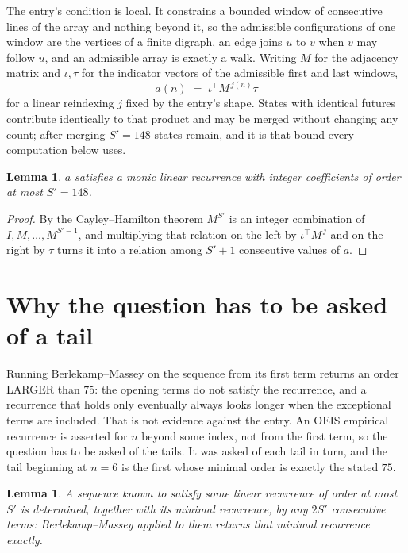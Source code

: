 \documentclass[11pt,a4paper]{article}
\theoremstyle{plain}
\newtheorem{lemma}[theorem]{Lemma}
\theoremstyle{definition}
\begin{document}
The entry's condition is local. It constrains a bounded window of consecutive lines of the
array and nothing beyond it, so the admissible configurations of one window are the vertices of
a finite digraph, an edge joins $u$ to $v$ when $v$ may follow $u$, and an admissible array is
exactly a walk. Writing $M$ for the adjacency matrix and $\iota,\tau$ for the indicator vectors
of the admissible first and last windows,
\[
a(n)\;=\;\iota^{\!\top}M^{\,j(n)}\tau
\]
for a linear reindexing $j$ fixed by the entry's shape. States with identical futures
contribute identically to that product and may be merged without changing any count; after
merging $S'=148$ states remain, and it is that bound every computation below uses.

\begin{lemma}\label{lem:cf}
$a$ satisfies a monic linear recurrence with integer coefficients of order at most $S'=148$.
\end{lemma}

\begin{proof}
By the Cayley--Hamilton theorem $M^{S'}$ is an integer combination of $I,M,\dots,M^{S'-1}$,
and multiplying that relation on the left by $\iota^{\!\top}M^{\,j}$ and on the right by
$\tau$ turns it into a relation among $S'+1$ consecutive values of $a$.
\end{proof}

\section{Why the question has to be asked of a tail}

Running Berlekamp--Massey on the sequence from its first term returns an order LARGER than $75$: the opening terms do not satisfy the recurrence, and a recurrence that holds only eventually always looks longer when the exceptional terms are included. That is not evidence against the entry. An OEIS empirical recurrence is asserted for $n$ beyond some index, not from the first term, so the question has to be asked of the tails. It was asked of each tail in turn, and the tail beginning at $n=6$ is the first whose minimal order is exactly the stated $75$.

\begin{lemma}\label{lem:bm}
A sequence known to satisfy some linear recurrence of order at most $S'$ is determined,
together with its minimal recurrence, by any $2S'$ consecutive terms: Berlekamp--Massey applied
to them returns that minimal recurrence exactly.
\end{lemma}
\end{document}
